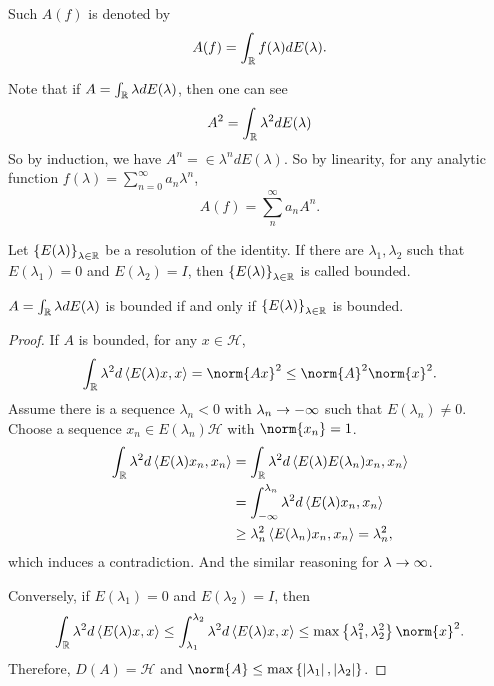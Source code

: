 \documentclass[a4paper,12pt]{article}
\begin{document}
Such $A(f)$ is denoted by
\begin{equation*}
    A(f) = \int_{\mathbb{R}} f(\lambda) dE(\lambda).
\end{equation*}
\begin{rmk}
    Note that if $A = \int_{\mathbb{R}} \lambda dE(\lambda)$, then one can see
    \begin{equation*}
        A^2 = \int_{\mathbb{R}} \lambda^2 dE(\lambda)
    \end{equation*}
    So by induction, we have $A^n = \in \lambda^n dE(\lambda)$. So by linearity, for any analytic function $f(\lambda) = \sum_{n=0}^\infty a_n \lambda^n$,
    \begin{equation*}
        A(f) = \sum_n^\infty a_n A^n.
    \end{equation*}
\end{rmk}

\begin{defn}
    Let $\left\{E(\lambda)\right\}_{\lambda \in \mathbb{R}}$ be a resolution of the identity. If there are $\lambda_1,\lambda_2$ such that $E(\lambda_1) = 0$ and $E(\lambda_2) = I$, then $\left\{E(\lambda)\right\}_{\lambda \in \mathbb{R}}$ is called bounded.
\end{defn}

\begin{prop}
    $A = \int_{\mathbb{R}} \lambda dE(\lambda)$ is bounded if and only if $\left\{E(\lambda)\right\}_{\lambda \in \mathbb{R}}$ is bounded.
\end{prop}
\begin{proof}
    If $A$ is bounded, for any $x \in \mathcal{H}$,
    \begin{equation*}
        \int_\R \lambda^2 d \inn{E(\lambda)x,x} = \norm{Ax}^2 \leq \norm{A}^2\norm{x}^2.
    \end{equation*}
    Assume there is a sequence $\lambda_n < 0$ with $\lambda_n \rightarrow -\infty$ such that $E(\lambda_n) \neq 0$. Choose a sequence $x_n \in E(\lambda_n)\mathcal{H}$ with $\norm{x_n} = 1$.
    \begin{equation*}
        \begin{aligned}
            \int_{\mathbb{R}} \lambda^2 d \left\langle E(\lambda)x_n,x_n \right\rangle &= \int_{\mathbb{R}} \lambda^2 d \left\langle E(\lambda)E(\lambda_n)x_n,x_n \right\rangle \\
            &= \int_{-\infty}^{\lambda_n} \lambda^2 d \left\langle E(\lambda)x_n,x_n \right\rangle \\
            &\geq \lambda_n^2 \left\langle E(\lambda_n)x_n,x_n \right\rangle = \lambda_n^2,
        \end{aligned}
    \end{equation*}
    which induces a contradiction. And the similar reasoning for $\lambda \rightarrow \infty$.

    Conversely, if $E(\lambda_1) = 0$ and $E(\lambda_2) = I$, then
    \begin{equation*}
        \int_\R \lambda^2 d \inn{E(\lambda)x,x} \leq \int_{\lambda_1}^{\lambda_2} \lambda^2 d \inn{E(\lambda)x,x} \leq \max\bb{\lambda_1^2,\lambda_2^2}\norm{x}^2.
    \end{equation*}
    Therefore, $D(A) = \mathcal{H}$ and $\norm{A} \leq \max \bb{\abs{\lambda_1},\abs{\lambda_2}}$.
\end{proof}
\end{document}
